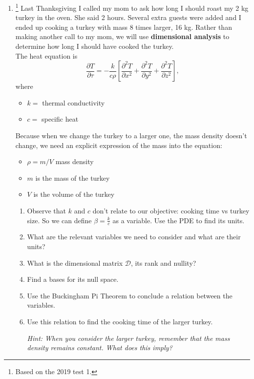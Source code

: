 \begin{enumerate}
	\item\label{q1}\footnote{Based on the 2019 test 1.} Last Thanksgiving I called my mom to ask how long I should roast my 2 kg turkey in the oven. She said 2 hours. Several extra guests were added and I ended up cooking a turkey with mass 8 times larger, 16 kg. Rather than making another call to my mom, we will use \textbf{dimensional analysis} to determine how long I should have cooked the turkey. \\
	
		The heat equation is
		\[
		\frac{\partial T}{\partial \tau} = -\frac{k}{c\rho} \left[ \frac{\partial^2 T}{\partial x^2} + \frac{\partial^2 T}{\partial y^2} + \frac{\partial^2 T}{\partial z^2} \right],
		\]
	where 
	\begin{itemize}
		\item $k = $ thermal conductivity %
		\item $c = $ specific heat %
	\end{itemize}

	Because when we change the turkey to a larger one, the mass density doesn't change, we need an explicit expression of the mass into the equation:
	\begin{itemize}
		\item $\rho = m/V$ mass density
		\item $m$ is the mass of the turkey
		\item $V$ is the volume of the turkey
	\end{itemize}

	\begin{enumerate}
		\item Observe that $k$ and $c$ don't relate to our objective: cooking time vs turkey size. So we can define $\beta = \frac{k}{c}$ as a variable. Use the PDE to find its units.
		\item What are the relevant variables we need to consider and what are their units?
		\item What is the dimensional matrix $\mathcal{D}$, its rank and nullity?
		\item Find a bases for its null space.
		\item Use the Buckingham Pi Theorem to conclude a relation between the variables.
		\item Use this relation to find the cooking time of the larger turkey.
		
		\textit{Hint: When you consider the larger turkey, remember that the mass density remains constant. What does this imply?}
	\end{enumerate}


\end{enumerate}
